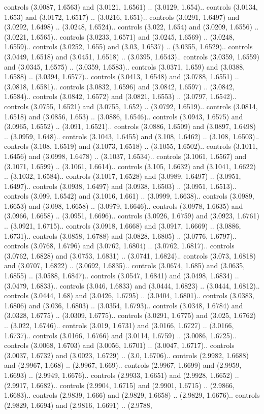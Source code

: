 controls (3.0087, 1.6563) and (3.0121, 1.6561) .. (3.0129, 1.654).. controls (3.0134, 1.653) and (3.0172, 1.6517) .. (3.0216, 1.651).. controls (3.0291, 1.6497) and (3.0292, 1.6498) .. (3.0248, 1.6524).. controls (3.022, 1.654) and (3.0209, 1.6556) .. (3.0221, 1.6565).. controls (3.0233, 1.6571) and (3.0245, 1.6569) .. (3.0248, 1.6559).. controls (3.0252, 1.655) and (3.03, 1.6537) .. (3.0355, 1.6529).. controls (3.0449, 1.6518) and (3.0451, 1.6518) .. (3.0395, 1.6543).. controls (3.0359, 1.6559) and (3.0345, 1.6575) .. (3.0359, 1.6583).. controls (3.0371, 1.659) and (3.0388, 1.6588) .. (3.0394, 1.6577).. controls (3.0413, 1.6548) and (3.0788, 1.6551) .. (3.0818, 1.6581).. controls (3.0832, 1.6596) and (3.0842, 1.6597) .. (3.0842, 1.6584).. controls (3.0842, 1.6572) and (3.0821, 1.6553) .. (3.0797, 1.6542).. controls (3.0755, 1.6521) and (3.0755, 1.652) .. (3.0792, 1.6519).. controls (3.0814, 1.6518) and (3.0856, 1.653) .. (3.0886, 1.6546).. controls (3.0943, 1.6575) and (3.0965, 1.6552) .. (3.091, 1.6521).. controls (3.0886, 1.6509) and (3.0897, 1.6498) .. (3.0959, 1.648).. controls (3.1043, 1.6455) and (3.108, 1.6462) .. (3.108, 1.6503).. controls (3.108, 1.6519) and (3.1073, 1.6518) .. (3.1055, 1.6502).. controls (3.1011, 1.6456) and (3.0998, 1.6478) .. (3.1037, 1.6534).. controls (3.1061, 1.6567) and (3.1071, 1.6599) .. (3.1061, 1.6614).. controls (3.105, 1.6632) and (3.1041, 1.6622) .. (3.1032, 1.6584).. controls (3.1017, 1.6528) and (3.0989, 1.6497) .. (3.0951, 1.6497).. controls (3.0938, 1.6497) and (3.0938, 1.6503) .. (3.0951, 1.6513).. controls (3.099, 1.6542) and (3.1016, 1.661) .. (3.0999, 1.6638).. controls (3.0989, 1.6653) and (3.098, 1.6658) .. (3.0979, 1.6646).. controls (3.0978, 1.6635) and (3.0966, 1.6658) .. (3.0951, 1.6696).. controls (3.0926, 1.6759) and (3.0923, 1.6761) .. (3.0921, 1.6715).. controls (3.0918, 1.6668) and (3.0917, 1.6669) .. (3.0886, 1.6731).. controls (3.0858, 1.6788) and (3.0828, 1.6805) .. (3.0776, 1.6797).. controls (3.0768, 1.6796) and (3.0762, 1.6804) .. (3.0762, 1.6817).. controls (3.0762, 1.6828) and (3.0753, 1.6831) .. (3.0741, 1.6824).. controls (3.073, 1.6818) and (3.0707, 1.6822) .. (3.0692, 1.6835).. controls (3.0674, 1.685) and (3.0635, 1.6855) .. (3.0588, 1.6847).. controls (3.0547, 1.6841) and (3.0498, 1.6834) .. (3.0479, 1.6833).. controls (3.046, 1.6833) and (3.0444, 1.6823) .. (3.0444, 1.6812).. controls (3.0444, 1.68) and (3.0426, 1.6795) .. (3.0404, 1.6801).. controls (3.0383, 1.6806) and (3.036, 1.6803) .. (3.0354, 1.6793).. controls (3.0348, 1.6784) and (3.0328, 1.6775) .. (3.0309, 1.6775).. controls (3.0291, 1.6775) and (3.025, 1.6762) .. (3.022, 1.6746).. controls (3.019, 1.6731) and (3.0166, 1.6727) .. (3.0166, 1.6737).. controls (3.0166, 1.6766) and (3.0114, 1.6759) .. (3.0086, 1.6725).. controls (3.0068, 1.6703) and (3.0056, 1.6701) .. (3.0047, 1.6717).. controls (3.0037, 1.6732) and (3.0023, 1.6729) .. (3.0, 1.6706).. controls (2.9982, 1.6688) and (2.9967, 1.668) .. (2.9967, 1.669).. controls (2.9967, 1.6699) and (2.9959, 1.6693) .. (2.9949, 1.6676).. controls (2.9933, 1.6651) and (2.9928, 1.6652) .. (2.9917, 1.6682).. controls (2.9904, 1.6715) and (2.9901, 1.6715) .. (2.9866, 1.6683).. controls (2.9839, 1.666) and (2.9829, 1.6658) .. (2.9829, 1.6676).. controls (2.9829, 1.6694) and (2.9816, 1.6691) .. (2.9788, 